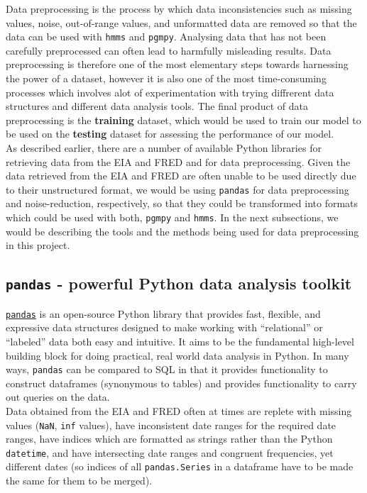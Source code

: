 Data preprocessing is the process by which data inconsistencies such as missing values, noise, out-of-range values, and unformatted data are removed so that the data can be used with \texttt{hmms} and \texttt{pgmpy}. Analysing data that has not been carefully preprocessed can often lead to harmfully misleading results. Data preprocessing is therefore one of the most elementary steps towards harnessing the power of a dataset, however it is also one of the most time-consuming processes which involves alot of experimentation with trying diffrerent data structures and different data analysis tools. The final product of data preprocessing is the \textbf{training} dataset, which would be used to train our model to be used on the \textbf{testing} dataset for assessing the performance of our model. \\

As described earlier, there are a number of available Python libraries for retrieving data from the EIA and FRED and for data preprocessing. Given the data retrieved from the EIA\cite{eiagit} and FRED\cite{fredgit} are often unable to be used directly due to their unstructured format, we would be using \texttt{pandas}\cite{pandasgit} for data preprocessing and noise-reduction, respectively, so that they could be transformed into formats which could be used with both, \texttt{pgmpy} and \texttt{hmms}. In the next subsections, we would be describing the tools and the methods being used for data preprocessing in this project. \\

\subsection{\texttt{pandas} - powerful Python data analysis toolkit}

\href{https://pandas.pydata.org/}{\texttt{pandas}} is an open-source Python library that provides fast, flexible, and expressive data structures designed to make working with \enquote{relational} or \enquote{labeled} data both easy and intuitive. It aims to be the fundamental high-level building block for doing practical, real world data analysis in Python. In many ways, \texttt{pandas} can be compared to SQL in that it provides functionality to construct dataframes (synonymous to tables) and provides functionality to carry out queries on the data. \\

\label{incons} Data obtained from the EIA and FRED often at times are replete with missing values (\texttt{NaN}, \texttt{inf} values), have inconsistent date ranges for the required date ranges, have indices which are formatted as strings rather than the Python \texttt{datetime}, and have intersecting date ranges and congruent frequencies, yet different dates (so indices of all \texttt{pandas.Series} in a dataframe have to be made the same for them to be merged). \\

